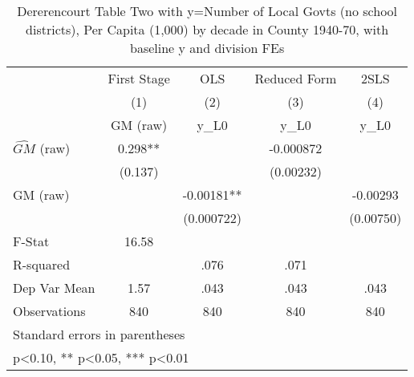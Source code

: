 \begin{table}[htbp]\centering
\def\sym#1{\ifmmode^{#1}\else\(^{#1}\)\fi}
\caption{Dererencourt Table Two with y=Number of Local Govts (no school districts), Per Capita (1,000) by decade in County 1940-70, with baseline y and division FEs}
\begin{tabular}{l*{4}{c}}
\toprule
                    & First Stage   &         OLS   &Reduced Form   &        2SLS   \\
                    &\multicolumn{1}{c}{(1)}&\multicolumn{1}{c}{(2)}&\multicolumn{1}{c}{(3)}&\multicolumn{1}{c}{(4)}\\
                    &\multicolumn{1}{c}{GM  (raw)}&\multicolumn{1}{c}{y\_L0}&\multicolumn{1}{c}{y\_L0}&\multicolumn{1}{c}{y\_L0}\\
\midrule
$\hat{GM}$ (raw)    &       0.298** &               &   -0.000872   &               \\
                    &     (0.137)   &               &   (0.00232)   &               \\
\addlinespace
GM  (raw)           &               &    -0.00181** &               &    -0.00293   \\
                    &               &  (0.000722)   &               &   (0.00750)   \\
\midrule
F-Stat              &       16.58   &               &               &               \\
R-squared           &               &        .076   &        .071   &               \\
Dep Var Mean        &        1.57   &        .043   &        .043   &        .043   \\
Observations        &         840   &         840   &         840   &         840   \\
\bottomrule
\multicolumn{5}{l}{\footnotesize Standard errors in parentheses}\\
\multicolumn{5}{l}{\footnotesize * p<0.10, ** p<0.05, *** p<0.01}\\
\end{tabular}
\end{table}

